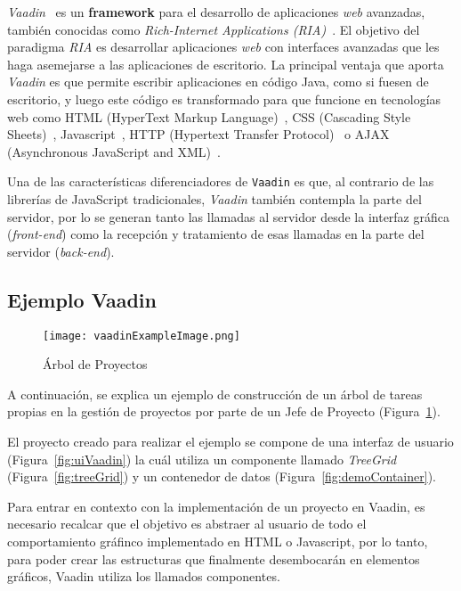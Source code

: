 

\emph{Vaadin}~\cite{vaadin} es un \textbf{framework} para el desarrollo de aplicaciones \emph{web} avanzadas, también conocidas como \emph{Rich-Internet Applications (RIA)}~\cite{ria}. El objetivo del paradigma \emph{RIA} es desarrollar aplicaciones \emph{web} con interfaces avanzadas que les haga asemejarse a las aplicaciones de escritorio. La principal ventaja que aporta \emph{Vaadin} es que permite escribir aplicaciones en código Java, como si fuesen de escritorio, y luego este código es transformado para que funcione en tecnologías web como HTML (HyperText Markup Language)~\cite{html}, CSS (Cascading Style Sheets)~\cite{css}, Javascript~\cite{javascript}, HTTP (Hypertext Transfer Protocol)~\cite{http} o AJAX (Asynchronous JavaScript and XML)~\cite{ajax}.

Una de las características diferenciadores de \texttt{Vaadin} es que, al contrario de las librerías de JavaScript tradicionales, \emph{Vaadin} también contempla la parte del servidor, por lo se generan tanto las llamadas al servidor desde la interfaz gráfica (\emph{front-end}) como la recepción y tratamiento de esas llamadas en la parte del servidor (\emph{back-end}).



 	
 \subsection{Ejemplo Vaadin}
 	
\begin{figure}[!tb]
	\centering
	\texttt{[image: vaadinExampleImage.png]}
	\caption{Árbol de Proyectos}
	\label{fig:vaadinExampleImage}
\end{figure}

A continuación, se explica un ejemplo de construcción de un árbol de tareas propias en la gestión de proyectos por parte de un Jefe de Proyecto (Figura~\ref{fig:vaadinExampleImage}).

El proyecto creado para realizar el ejemplo se compone de una interfaz de usuario (Figura~\ref{fig:uiVaadin}) la cuál utiliza un componente llamado \emph{TreeGrid}  (Figura~\ref{fig:treeGrid}) y un contenedor de datos (Figura~\ref{fig:demoContainer}).

Para entrar en contexto con la implementación de un proyecto en Vaadin, es necesario recalcar que el objetivo es abstraer al usuario de todo el comportamiento gráfinco implementado en HTML o Javascript, por lo tanto, para poder crear las estructuras que finalmente desembocarán en elementos gráficos, Vaadin utiliza los llamados componentes.


